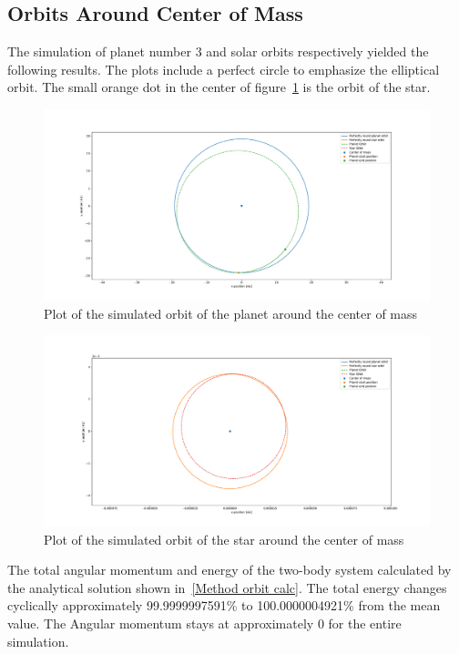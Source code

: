 \documentclass[reprint,english,notitlepage]{revtex4-2}
\begin{document}
\subsection{Orbits Around Center of Mass}
	The simulation of planet number 3 and solar orbits respectively yielded the following results.
	The plots include a perfect circle to emphasize the elliptical orbit.
	The small orange dot in the center of figure~\ref{fig: P_orbit_cm} is the orbit of the star.
	\begin{figure}[h!]
	  \centering
	  \includegraphics[scale = 0.15]{Figures/Planet_Orbit_CM}
	  \caption{Plot of the simulated orbit of the planet around the center of mass}
	  \label{fig: P_orbit_cm}
	\end{figure}
	
	\begin{figure}[h!]
	  \centering
	  \includegraphics[scale = 0.15]{Figures/Solar_Orbit_CM}
	  \caption{Plot of the simulated orbit of the star around the center of mass}
	  \label{fig: S_orbit_cm}
	\end{figure}
	
	The total angular momentum and energy of the two-body system calculated by the analytical solution shown in~\ref{Method orbit calc}.
	The total energy changes cyclically approximately 99.9999997591\% to 100.0000004921\% from the mean value.
	The Angular momentum stays at approximately 0 for the entire simulation.
	
\end{document}
